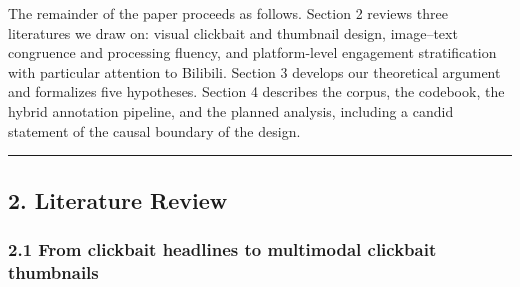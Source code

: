 \documentclass[
  12pt,
]{article}
\begin{document}
The remainder of the paper proceeds as follows. Section 2 reviews three
literatures we draw on: visual clickbait and thumbnail design,
image--text congruence and processing fluency, and platform-level
engagement stratification with particular attention to Bilibili. Section
3 develops our theoretical argument and formalizes five hypotheses.
Section 4 describes the corpus, the codebook, the hybrid annotation
pipeline, and the planned analysis, including a candid statement of the
causal boundary of the design.

\begin{center}\rule{0.5\linewidth}{0.5pt}\end{center}

\subsection{2. Literature Review}\label{literature-review}

\subsubsection{2.1 From clickbait headlines to multimodal clickbait
thumbnails}\label{from-clickbait-headlines-to-multimodal-clickbait-thumbnails}
\end{document}
